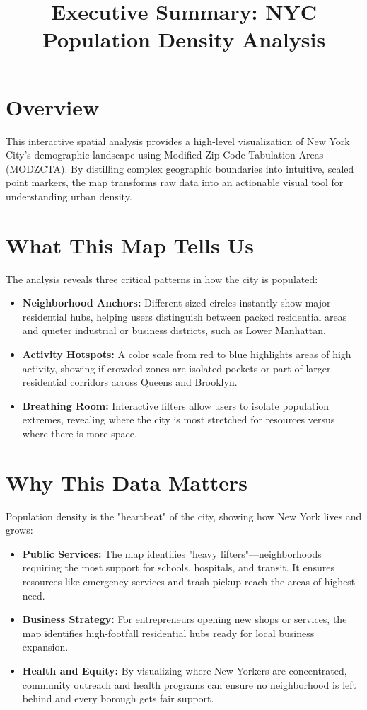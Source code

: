 \documentclass[12pt]{article}
\title{\vspace{-1.0cm}\textbf{Executive Summary: NYC Population Density Analysis}}
\author{}
\date{}
\begin{document}
	
	\maketitle
	\vspace{-1.0cm}
	
	\section*{Overview}
	This interactive spatial analysis provides a high-level visualization of New York City’s demographic landscape using Modified Zip Code Tabulation Areas (MODZCTA). By distilling complex geographic boundaries into intuitive, scaled point markers, the map transforms raw data into an actionable visual tool for understanding urban density.
	
	\section*{What This Map Tells Us}
	The analysis reveals three critical patterns in how the city is populated:
	
	\begin{itemize}[nosep] %
		\item \textbf{Neighborhood Anchors:} Different sized circles instantly show major residential hubs, helping users distinguish between packed residential areas and quieter industrial or business districts, such as Lower Manhattan.
		\item \textbf{Activity Hotspots:} A color scale from red to blue highlights areas of high activity, showing if crowded zones are isolated pockets or part of larger residential corridors across Queens and Brooklyn.
		\item \textbf{Breathing Room:} Interactive filters allow users to isolate population extremes, revealing where the city is most stretched for resources versus where there is more space.
	\end{itemize}
	
	\section*{Why This Data Matters}
	Population density is the "heartbeat" of the city, showing how New York lives and grows:
	
	\begin{itemize}[nosep]
		\item \textbf{Public Services:} The map identifies "heavy lifters"—neighborhoods requiring the most support for schools, hospitals, and transit. It ensures resources like emergency services and trash pickup reach the areas of highest need.
		\item \textbf{Business Strategy:} For entrepreneurs opening new shops or services, the map identifies high-footfall residential hubs ready for local business expansion.
		\item \textbf{Health and Equity:} By visualizing where New Yorkers are concentrated, community outreach and health programs can ensure no neighborhood is left behind and every borough gets fair support.
	\end{itemize}
	
\end{document}
